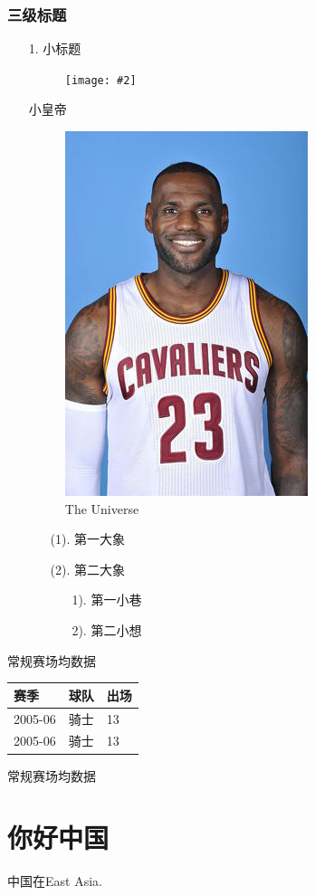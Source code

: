 \documentclass[a4paper,left=1.5cm,right=1.5cm,11pt]{article}
\newcommand{\sizedfic}[2]{\begin{figure}[H]
		\center
		\texttt{[image: \#2]}
	\end{figure}}
\begin{document}
\subsubsection{三级标题}
\begin{itemize}
	\item[1.]小标题 
	\sizedfic{0.4}{king.jpg}
	\begin{center}
	小皇帝
	\end{center}
	\begin{figure}[h!]
	\centering
	\includegraphics[scale=1.7]{king.jpg}
	\caption{The Universe}
	\label{fig:univerise}
	\end{figure}
	\begin{itemize}
		\item[(1).] 第一大象
		\item[(2).] 第二大象
		\begin{itemize}
			\item[1).] 第一小巷
			\item[2).] 第二小想
		\end{itemize}
	\end{itemize}
\end{itemize}
常规赛场均数据
\begin{tabular}[c]{|l|l|l|}
\hline
\hline
赛季 & 球队 & 出场\\
\hline\hline
2005-06 & 骑士 & 13\\
2005-06 & 骑士 & 13\\
\hline
\end{tabular}
常规赛场均数据\\
\section{你好中国}
中国在East Asia.
\end{document}
